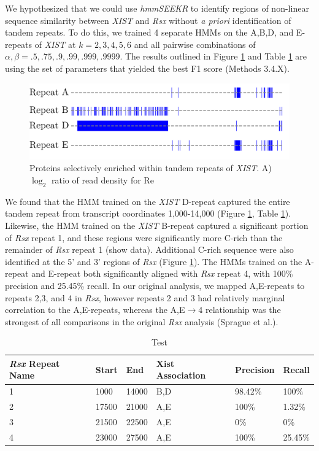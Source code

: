 We hypothesized that we could use \emph{hmmSEEKR} to identify regions of non-linear sequence similarity between \emph{XIST} and \emph{Rsx} without \emph{a priori} identification of tandem repeats. To do this, we trained 4 separate HMMs on the A,B,D, and E-repeats of \emph{XIST} at $k=2,3,4,5,6$ and all pairwise combinations of $\alpha,\beta = .5,.75,.9,.99,.999,.9999$. The results outlined in Figure \ref{fig:koalarsxhmm} and Table \ref{tbl:rsxresults} are using the set of parameters that yielded the best F1 score (Methods 3.4.X). 


\begin{figure}[h!]
\centering
\includegraphics[width=\textwidth]{images/koalarsx.pdf}
\caption{Proteins selectively enriched within tandem repeats of \emph{XIST}. A) $\log_2$ ratio of read density for Re}
\label{fig:koalarsxhmm}
\end{figure}

We found that the HMM trained on the \emph{XIST} D-repeat captured the entire tandem repeat from transcript coordinates 1,000-14,000 (Figure \ref{fig:koalarsxhmm}, Table \ref{tbl:rsxresults}). Likewise, the HMM trained on the \emph{XIST} B-repeat captured a significant portion of \emph{Rsx} repeat 1, and these regions were significantly more C-rich than the remainder of \emph{Rsx} repeat 1 (show data). Additional C-rich sequence were also identified at the 5' and 3' regions of \emph{Rsx} (Figure \ref{fig:koalarsxhmm}). The HMMs trained on the A-repeat and E-repeat both significantly aligned with \emph{Rsx} repeat 4, with 100\% precision and 25.45\% recall. In our original analysis, we mapped A,E-repeats to repeats 2,3, and 4 in \emph{Rsx}, however repeats 2 and 3 had relatively marginal correlation to the A,E-repeats, whereas the A,E$\rightarrow$4 relationship was the strongest of all comparisons in the original \emph{Rsx} analysis (Sprague et al.).

\begin{table}[h!]
\centering
\begin{tabular}{|l|l|l|l|l|l|}
\hline 
\emph{Rsx} Repeat Name& Start & End   & Xist Association   & Precision& Recall                      \\
\hline 
    1&  1000   & 14000    & B,D     & 98.42\% & 100\% \\
      2&17500 & 21000  & A,E     & 100\%   & 1.32\% \\
      3&21500  & 22500   & A,E      & 0\% & 0\%  \\
      4&23000 & 27500  & A,E     & 100\%   & 25.45\% \\
\hline 
\end{tabular}
\caption{Test}
\label{tbl:rsxresults}
\end{table}
